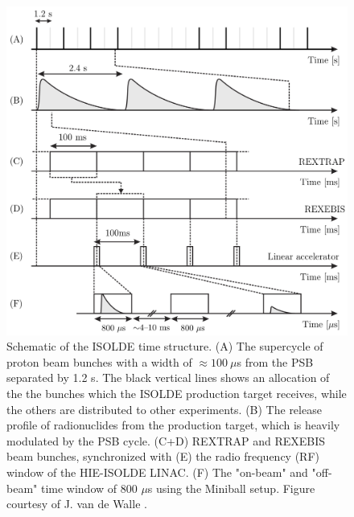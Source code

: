 \documentclass[twoside,english]{uiofysmaster/uiofysmaster}
\begin{document}
\begin{figure}[ht]
	\centering
	\includegraphics[width=\textwidth]{Images/Time-structure.png}
	\caption{Schematic of the ISOLDE time structure. (A) The supercycle of proton beam bunches with a width of $\approx 100 ~\mu$s from the PSB separated by 1.2 s. The black vertical lines shows an allocation of the the bunches which the ISOLDE production target receives, while the others are distributed to other experiments. (B) The release profile of radionuclides from the production target, which is heavily modulated by the PSB cycle. (C+D) REXTRAP and REXEBIS beam bunches, synchronized with (E) the radio frequency (RF) window of the HIE-ISOLDE LINAC. (F) The "on-beam" and "off-beam" time window of 800 $\mu$s using the Miniball setup. Figure courtesy of J. van de Walle \cite{HI-TDR}.}
	\label{fig:ITS}
\end{figure}
\end{document}
